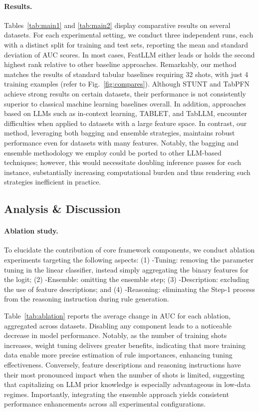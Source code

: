 \vspace*{-0.12in}
\paragraph{Results.}
Tables~\ref{tab:main1} and \ref{tab:main2} display comparative results on several datasets. For each experimental setting, we conduct three independent runs, each with a distinct split for training and test sets, reporting the mean and standard deviation of AUC scores. In most cases, \textsf{FeatLLM} either leads or holds the second highest rank relative to other baseline approaches. Remarkably, our method matches the results of standard tabular baselines requiring 32 shots, with just 4 training examples (refer to Fig.~\ref{fig:compares}). Although STUNT and TabPFN achieve strong results on certain datasets, their performance is not consistently superior to classical machine learning baselines overall. In addition, approaches based on LLMs such as in-context learning, TABLET, and TabLLM, encounter difficulties when applied to datasets with a large feature space. In contrast, our method, leveraging both bagging and ensemble strategies, maintains robust performance even for datasets with many features. Notably, the bagging and ensemble methodology we employ could be ported to other LLM-based techniques; however, this would necessitate doubling inference passes for each instance, substantially increasing computational burden and thus rendering such strategies inefficient in practice.

\subsection{Analysis \& Discussion}
\label{sec:analysis}
\paragraph{Ablation study.} To elucidate the contribution of core framework components, we conduct ablation experiments targeting the following aspects: (1) \textsf{-Tuning}: removing the parameter tuning in the linear classifier, instead simply aggregating the binary features for the logit; (2) \textsf{-Ensemble}: omitting the ensemble step; (3) \textsf{-Description}: excluding the use of feature descriptions; and (4) \textsf{-Reasoning}: eliminating the Step-1 process from the reasoning instruction during rule generation.

Table~\ref{tab:ablation} reports the average change in AUC for each ablation, aggregated across datasets. Disabling any component leads to a noticeable decrease in model performance. Notably, as the number of training shots increases, weight tuning delivers greater benefits, indicating that more training data enable more precise estimation of rule importances, enhancing tuning effectiveness. Conversely, feature descriptions and reasoning instructions have their most pronounced impact when the number of shots is limited, suggesting that capitalizing on LLM prior knowledge is especially advantageous in low-data regimes. Importantly, integrating the ensemble approach yields consistent performance enhancements across all experimental configurations.

